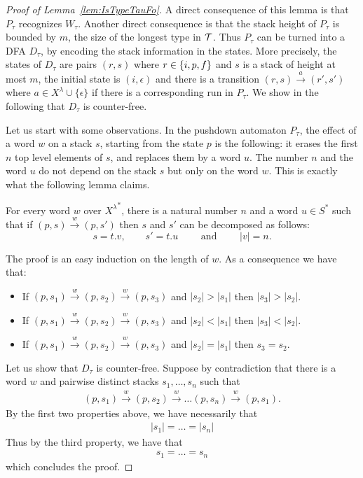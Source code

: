 \begin{proof}[Proof of Lemma~\ref{lem:IsTypeTauFo}]
A direct consequence of this lemma is that $P_\tau$ recognizes $W_\tau$. Another direct consequence is that the stack height of $P_\tau$ is bounded by $m$, the size of the longest type in ${\mathcal T}$. Thus $P_\tau$ can be turned into a DFA $D_\tau$, by encoding the stack information in the states. More precisely, the states of $D_\tau$ are pairs $(r,s)$ where $r\in \{i,p,f\}$ and $s$ is a stack of height at most $m$, the initial state is $(i,\epsilon)$ and there is a transition $(r,s)\xrightarrow{a}(r',s')$ where $a\in X^\lambda\cup\{\epsilon\}$ if there is a corresponding run in $P_\tau$. We show in the following that $D_\tau$ is counter-free. 

Let us start with some observations. In the pushdown automaton $P_\tau$, the effect of a word $w$ on a stack $s$, starting from the state $p$ is the following: it erases the first $n$ top level elements of $s$, and replaces them by a word $u$. The number $n$ and the word $u$ do not depend on the stack $s$ but only on the word $w$. This is exactly what the following lemma claims.

\begin{lemma}
For every word $w$ over ${X^\lambda}^*$, there is a natural number $n$ and a word $u\in S^*$ such that if $(p,s)\xrightarrow{w}(p,s')$ then $s$ and $s'$ can be decomposed as follows:
$$s=t.v,\qquad s'=t.u\qquad \text{ and }\qquad |v|=n.$$
\end{lemma}
The proof is an easy induction on the length of $w$. As a consequence we have that:
\begin{itemize}
\item If $(p,s_1)\xrightarrow{w}(p,s_2)\xrightarrow{w}(p,s_3)$ and $|s_2|>|s_1|$ then $|s_3|>|s_2|$.
\item If $(p,s_1)\xrightarrow{w}(p,s_2)\xrightarrow{w}(p,s_3)$ and $|s_2|<|s_1|$ then $|s_3|<|s_2|$.
\item If $(p,s_1)\xrightarrow{w}(p,s_2)\xrightarrow{w}(p,s_3)$ and $|s_2|=|s_1|$ then $s_3 =s_2$.
\end{itemize}

Let us show that $D_\tau$ is counter-free. Suppose by contradiction that there is a word $w$ and pairwise distinct stacks $s_1,\dots, s_n$ such that 
\begin{align*}
(p,s_1)\xrightarrow{w}(p,s_2)\xrightarrow{w}\dots(p,s_n)\xrightarrow{w}(p,s_1).
\end{align*} 
By the first two properties above, we have necessarily that 
\begin{align*}
|s_1|=\dots=|s_n|
\end{align*}
 Thus by the third property, we have that 
\begin{align*}
 s_1=\dots=s_n
\end{align*} 
 which concludes the proof.
\end{proof}



